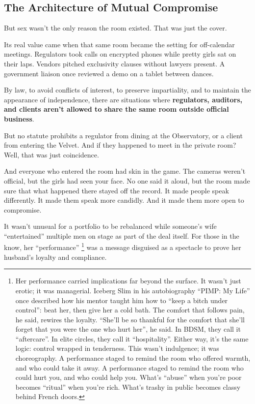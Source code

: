 \medskip

\subsection{The Architecture of Mutual Compromise}


But sex wasn’t the only reason the room existed. That was just the cover.

Its real value came when that same room became the setting for off-calendar meetings. Regulators took calls on encrypted 
phones while pretty girls sat on their laps. Vendors pitched exclusivity clauses without lawyers present. A government 
liaison once reviewed a demo on a tablet between dances.

By law, to avoid conflicts of interest, to preserve impartiality, and to maintain the appearance of independence,
there are situations where \textbf{regulators, auditors, and clients aren’t allowed to share the same room outside
official business}.

But no statute prohibits a regulator from dining at the Observatory, or a client from entering the Velvet. And if they 
happened to meet in the private room? Well, that was just coincidence.

And everyone who entered the room had skin in the game. The cameras weren’t official, but the girls had seen your face. No 
one said it aloud, but the room made sure that what happened there stayed off the record. It made people speak differently. 
It made them speak more candidly. And it made them more open to compromise.


It wasn’t unusual for a portfolio to be rebalanced while someone’s wife “entertained” multiple men on stage as part of 
the deal itself. For those in the know, her ``performance'' 
\footnote{Her performance carried implications far beyond the surface. It wasn’t just erotic; it was managerial.
Iceberg Slim in his autobiography ``PIMP: My Life'' once described how his mentor taught him how to ``keep a bitch under 
control'': beat her, then give her a cold bath. The comfort
that follows pain, he said, rewires the loyalty. ``She'll be so thankful for the comfort that she'll forget that you were 
the one who hurt her'', he said. In BDSM, they call it ``aftercare''.
In elite circles, they call it ``hospitality''. Either way, it’s the same logic: control wrapped in tenderness.
This wasn’t indulgence; it was choreography. A performance staged to remind the room who offered warmth,
and who could take it away. A performance staged to remind the room who could hurt you, and who could help you.
What’s ``abuse'' when you’re poor becomes ``ritual'' when you’re rich.
What’s trashy in public becomes classy behind French doors.}
was a message disguised as a spectacle to prove her husband's loyalty and compliance.

